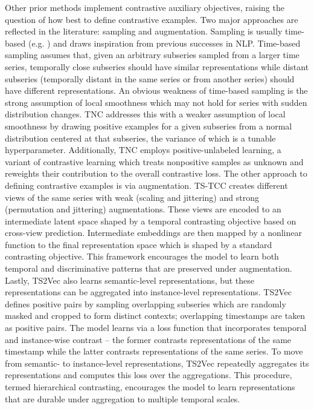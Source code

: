 \documentclass{article}
\begin{document}
Other prior methods implement contrastive auxiliary objectives, raising the question of how best to define contrastive examples. Two major approaches are reflected in the literature: sampling and augmentation. Sampling is usually time-based (e.g. \cite{franceschi19-timesampling}) and draws inspiration from previous successes in NLP. Time-based sampling assumes that, given an arbitrary subseries sampled from a larger time series, temporally close subseries should have similar representations while distant subseries (temporally distant in the same series or from another series) should have different representations. An obvious weakness of time-based sampling is the strong assumption of local smoothness which may not hold for series with sudden distribution changes. TNC \cite{tonekaboni21-tnc} addresses this with a weaker assumption of local smoothness by drawing positive examples for a given subseries from a normal distribution centered at that subseries, the variance of which is a tunable hyperparameter. Additionally, TNC employs positive-unlabeled learning, a variant of contrastive learning which treats nonpositive samples as unknown and reweights their contribution to the overall contrastive loss. The other approach to defining contrastive examples is via augmentation. TS-TCC \cite{eldele21-tstcc} creates different views of the same series with weak (scaling and jittering) and strong (permutation and jittering) augmentations. These views are encoded to an intermediate latent space shaped by a temporal contrasting objective based on cross-view prediction. Intermediate embeddings are then mapped by a nonlinear function to the final representation space which is shaped by a standard contrasting objective. This framework encourages the model to learn both temporal and discriminative patterns that are preserved under augmentation. Lastly, TS2Vec \cite{yue21-ts2vec} also learns semantic-level representations, but these representations can be aggregated into instance-level representations. TS2Vec defines positive pairs by sampling overlapping subseries which are randomly masked and cropped to form distinct contexts; overlapping timestamps are taken as positive pairs. The model learns via a loss function that incorporates temporal and instance-wise contrast -- the former contrasts representations of the same timestamp while the latter contrasts representations of the same series. To move from semantic- to instance-level representations, TS2Vec repeatedly aggregates its representations and computes this loss over the aggregations. This procedure, termed hierarchical contrasting, encourages the model to learn representations that are durable under aggregation to multiple temporal scales.
\end{document}
